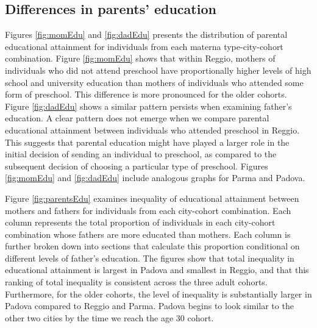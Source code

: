 



\doublespacing

\subsection{Differences in parents' education}

Figures \ref{fig:momEdu} and \ref{fig:dadEdu} presents the distribution of parental educational attainment for individuals from each materna type-city-cohort combination. Figure \ref{fig:momEdu} shows that within Reggio, mothers of individuals who did not attend preschool have proportionally higher levels of high school and university education than mothers of individuals who attended some form of preschool. This difference is more pronounced for the older cohorts. Figure \ref{fig:dadEdu} shows a similar pattern persists when examining father's education. A clear pattern does not emerge when we compare parental educational attainment between individuals who attended preschool in Reggio. This suggests that parental education might have played a larger role in the initial decision of sending an individual to preschool, as compared to the subsequent decision of choosing a particular type of preschool. Figures \ref{fig:momEdu} and \ref{fig:dadEdu} include analogous graphs for Parma and Padova.

Figure \ref{fig:parentsEdu} examines inequality of educational attainment between mothers and fathers for individuals from each city-cohort combination. Each column represents the total proportion of individuals in each city-cohort combination whose fathers are more educated than mothers. Each column is further broken down into sections that calculate this proportion conditional on different levels of father's education. The figures show that total inequality in educational attainment is largest in Padova and smallest in Reggio, and that this ranking of total inequality is consistent across the three adult cohorts. Furthermore, for the older cohorts, the level of inequality is substantially larger in Padova compared to Reggio and Parma. Padova begins to look similar to the other two cities by the time we reach the age 30 cohort. 


